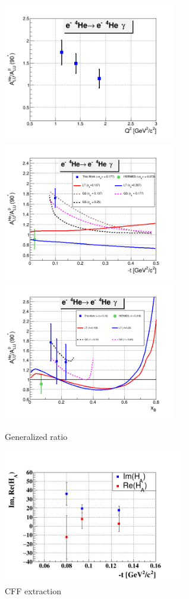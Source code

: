 \documentclass[%
 reprint,
 amsmath,amssymb,
 aps,
]{revtex4-1}
\begin{document}
\begin{figure}[htbp]
\caption{\label{fig:GenR} Generalized ratio}
\includegraphics[width=7.5cm]{coh_emc_Q2.png}
\includegraphics[width=7.5cm]{coh_emc_t.png}
\includegraphics[width=7.5cm]{coh_emc_xB.png}
\end{figure}

\begin{figure}[htbp]
\caption{\label{fig:CFF} CFF extraction}
\includegraphics[width=8cm]{HA_t.png}
\end{figure}
\end{document}
